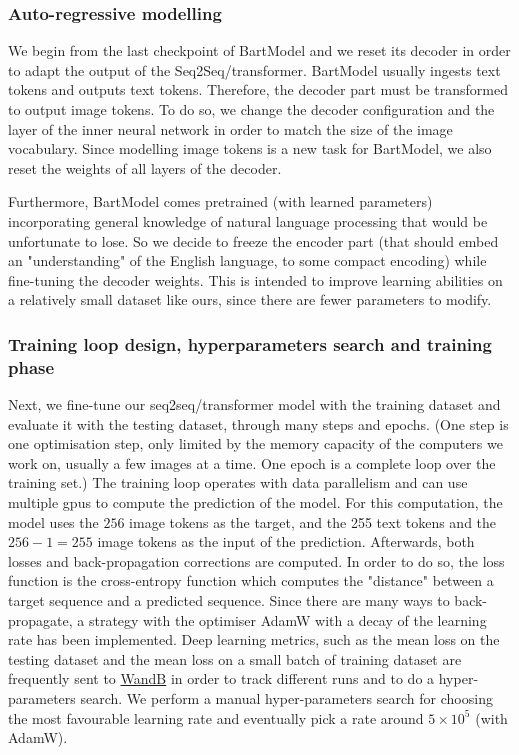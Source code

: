 \documentclass{article}
\begin{document}
\begin{multicols}{2}
\subsubsection{Auto-regressive modelling}

We begin from the last checkpoint of BartModel and we reset its decoder in order to adapt the output of the Seq2Seq/transformer. BartModel usually ingests text tokens and outputs text tokens. Therefore, the decoder part must be transformed to output image tokens. To do so, we change the decoder configuration and the layer of the inner neural network in order to match the size of the image vocabulary. Since modelling image tokens is a new task for BartModel, we also reset the weights of all layers of the decoder.

Furthermore, BartModel comes pretrained (with learned parameters) incorporating general knowledge of natural language processing that would be unfortunate to lose. So we decide to freeze the encoder part (that should embed an "understanding" of the English language, to some compact encoding) while fine-tuning the decoder weights. This is intended to improve learning abilities on a relatively small dataset like ours, since there are fewer parameters to modify.

\subsubsection{Training loop design, hyperparameters search and training phase}

Next, we fine-tune our seq2seq/transformer model with the training dataset and evaluate it with the testing dataset, through many steps and epochs. (One step is one optimisation step, only limited by the memory capacity of the computers we work on, usually a few images at a time. One epoch is a complete loop over the training set.) The training loop operates with data parallelism and can use multiple \acrshort{gpu}s to compute the prediction of the model. For this computation, the model uses the $256$ image tokens as the target, and the 255 text tokens and the $256-1=255$ image tokens as the input of the prediction.
Afterwards, both losses and back-propagation corrections are computed. In order to do so, the loss function is the cross-entropy function which computes the "distance" between a target sequence and a predicted sequence. Since there are many ways to back-propagate, a strategy with the optimiser AdamW with a decay of the learning rate has been implemented.
Deep learning metrics, such as the mean loss on the testing dataset and the mean loss on a small batch of training dataset are frequently sent to \href{https://wandb.ai/cthiounn/dalle-tiny}{WandB} in order to track different runs and to do a hyper-parameters search.
We perform a manual hyper-parameters search for choosing the most favourable learning rate and eventually pick a rate around $5\times 10^5$ (with AdamW).


\end{multicols}
\end{document}
